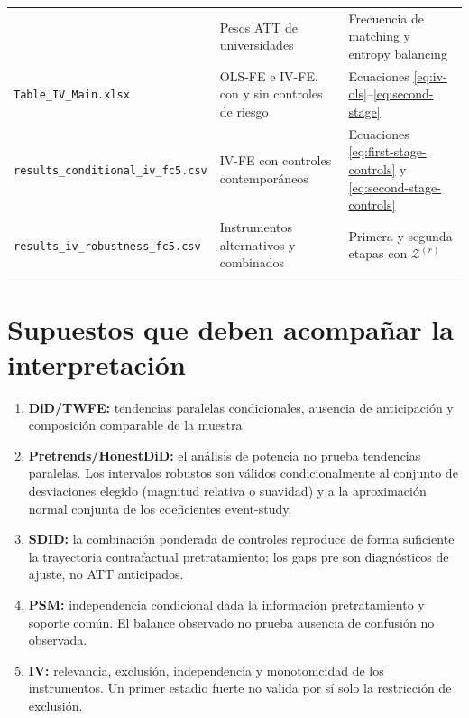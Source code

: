 \documentclass[11pt]{article}
\newcommand{\file}[1]{\texttt{#1}}
\begin{document}
\begin{longtable}{>{\raggedright\arraybackslash}p{}
                  >{\raggedright\arraybackslash}p{}
                  >{\raggedright\arraybackslash}p{}}
& Pesos ATT de universidades
& Frecuencia de matching y entropy balancing \\
\addlinespace
\file{Table\_IV\_Main.xlsx}
& OLS-FE e IV-FE, con y sin controles de riesgo
& Ecuaciones \eqref{eq:iv-ols}--\eqref{eq:second-stage} \\
\addlinespace
\file{results\_conditional\_iv\_fc5.csv}
& IV-FE con controles contemporáneos
& Ecuaciones \eqref{eq:first-stage-controls} y \eqref{eq:second-stage-controls} \\
\addlinespace
\file{results\_iv\_robustness\_fc5.csv}
& Instrumentos alternativos y combinados
& Primera y segunda etapas con $\mathcal Z^{(r)}$ \\
\bottomrule
\end{longtable}

\section{Supuestos que deben acompañar la interpretación}

\begin{enumerate}
 \item \textbf{DiD/TWFE:} tendencias paralelas condicionales, ausencia de
 anticipación y composición comparable de la muestra.
 \item \textbf{Pretrends/HonestDiD:} el análisis de potencia no prueba
 tendencias paralelas. Los intervalos robustos son válidos condicionalmente al
 conjunto de desviaciones elegido (magnitud relativa o suavidad) y a la
 aproximación normal conjunta de los coeficientes event-study.
 \item \textbf{SDID:} la combinación ponderada de controles reproduce de forma
 suficiente la trayectoria contrafactual pretratamiento; los gaps pre son
 diagnósticos de ajuste, no ATT anticipados.
 \item \textbf{PSM:} independencia condicional dada la información
 pretratamiento y soporte común. El balance observado no prueba ausencia de
 confusión no observada.
 \item \textbf{IV:} relevancia, exclusión, independencia y monotonicidad de los
 instrumentos. Un primer estadio fuerte no valida por sí solo la restricción de
 exclusión.
\end{enumerate}
\end{document}
